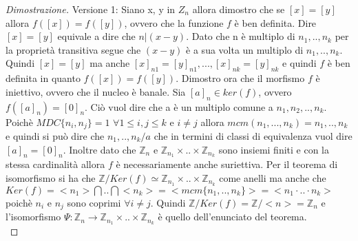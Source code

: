 \documentclass{article}
\theoremstyle{definition}
\theoremstyle{plain}
\theoremstyle{plain}
\theoremstyle{plain}
\theoremstyle{plain}
\begin{document}
\begin{proof}[Dimostrazione]
    Versione 1: \newline
    Siano x, y in $Z_n$ allora dimostro che se $[x] = [y]$ allora $f([x]) = f([y])$, ovvero che la funzione $f$ è ben definita.
    Dire $[x] = [y]$ equivale a dire che $n | (x - y)$. Dato che n è multiplo di $n_1, .. ,n_k$ per la proprietà transitiva segue che $(x - y)$ è a sua volta un multiplo di $n_1, .., n_k$. Quindi $[x] = [y]$ ma anche $[x]_{n1} = [y]_{n1}, ..., [x]_{nk} = [y]_{nk}$ e quindi $f$ è ben definita in quanto $f([x]) = f([y])$. \newline
    Dimostro ora che il morfismo $f$ è iniettivo, ovvero che il nucleo è banale. Sia $[a]_n \in ker(f)$, ovvero $f([a]_n) = [0]_n$. Ciò vuol dire che a è un multiplo comune a $n_1, n_2, .., n_k$. Poichè $MDC\{n_i, n_j\} = 1$ $\forall 1 \le i, j \le k$ e $i \neq j$ allora $mcm(n_1, ..., n_k) = n_1, .., n_k$ e quindi si può dire che $n_1, .., n_k / a$ che in termini di classi di equivalenza vuol dire $[a]_n = [0]_n$. \newline
    Inoltre dato che $\mathbb{Z}_n$ e $\mathbb{Z}_{n_1} \times .. \times \mathbb{Z}_{n_k}$ sono insiemi finiti e con la stessa cardinalità allora $f$ è necessariamente anche suriettiva. \newline
     Per il teorema di isomorfismo si ha che $\mathbb{Z}/{Ker(f)} \simeq \mathbb{Z}_{n_1} \times .. \times \mathbb{Z}_{n_k}$ come anelli ma anche che $Ker(f) = <n_1> \bigcap .. \bigcap <n_k> = <mcm\{n_1, .., n_k\}> = <n_1 \cdot .. \cdot n_k>$ poichè $n_i$ e $n_j$ sono coprimi $\forall i \neq j$. \newline
    Quindi $\mathbb{Z}/{Ker(f) = \mathbb{Z}/{<n>} = \mathbb{Z}_n}$ e l'isomorfismo $\Psi : \mathbb{Z}_n \rightarrow \mathbb{Z}_{n_1} \times .. \times \mathbb{Z}_{n_k}$ è quello dell'enunciato del teorema.
    \\
    

\end{proof}
\end{document}
